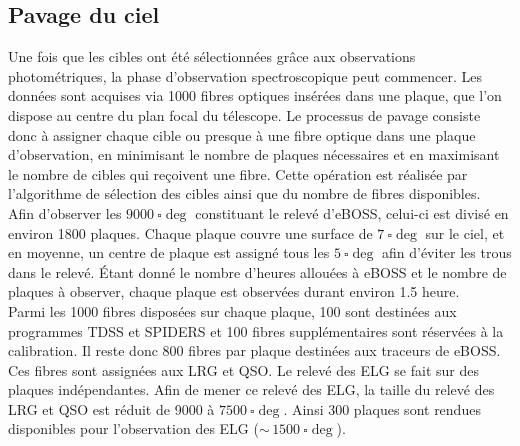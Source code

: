 \subsection{Pavage du ciel}

Une fois que les cibles ont été sélectionnées grâce aux observations photométriques, la phase d'observation spectroscopique peut commencer. Les données sont acquises via \num{1000} fibres optiques insérées dans une plaque, que l'on dispose au centre du plan focal du télescope. 
Le processus de \og pavage \fg \autocite{Blanton2001} consiste donc à assigner chaque cible ou presque à une fibre optique dans une plaque d'observation, en minimisant le nombre de plaques nécessaires et en maximisant le nombre de cibles qui reçoivent une fibre. Cette opération est réalisée par l'algorithme de sélection des cibles ainsi que du nombre de fibres disponibles. \\
Afin d'observer les $\SI{9000}{\square\deg}$ constituant le relevé d'eBOSS, celui-ci est divisé en environ \num{1800} plaques. Chaque plaque couvre une surface de $\SI{7}{\square\deg}$ sur le ciel, et en moyenne, un centre de plaque est assigné tous les $\SI{5}{\square\deg}$ afin d'éviter les trous dans le relevé. Étant donné le nombre d'heures allouées à eBOSS et le nombre de plaques à observer, chaque plaque est observées durant environ \num{1,5} heure. \\
Parmi les \num{1000} fibres disposées sur chaque plaque, \num{100} sont destinées aux programmes TDSS et SPIDERS et \num{100} fibres supplémentaires sont réservées à la calibration. Il reste donc \num{800} fibres par plaque destinées aux traceurs de eBOSS. Ces fibres sont assignées aux LRG et QSO. Le relevé des ELG se fait sur des plaques indépendantes. Afin de mener ce relevé des ELG, la taille du relevé des LRG et QSO est réduit de \num{9000} à $\SI{7500}{\square\deg}$. Ainsi \num{300} plaques sont rendues disponibles pour l'observation des ELG ($\sim\,\SI{1500}{\square\deg}$).


